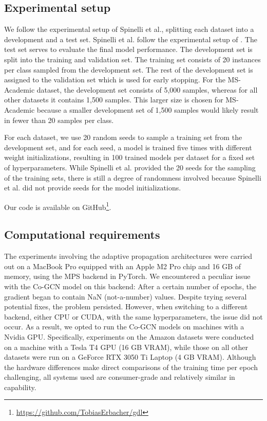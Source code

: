 \documentclass{gdl}
\begin{document}
\subsection{Experimental setup}
\label{sec:experimental-setup}
We follow the experimental setup of Spinelli et al., splitting each dataset into a development and a test set. Spinelli et al. follow the experimental setup of \cite{Klicpera2019}. The test set serves to evaluate the final model performance. The development set is split into the training and validation set. The training set consists of 20 instances per class sampled from the development set. The rest of the development set is assigned to the validation set which is used for early stopping. For the MS-Academic dataset, the development set consists of 5,000 samples, whereas for all other datasets it contains 1,500 samples. This larger size is chosen for MS-Academic because a smaller development set of 1,500 samples would likely result in fewer than 20 samples per class. 

For each dataset, we use 20 random seeds to sample a training set from the development set, and for each seed, a model is trained five times with different weight initializations, resulting in 100 trained models per dataset for a fixed set of hyperparameters. While Spinelli et al. provided the 20 seeds for the sampling of the training sets, there is still a degree of randomness involved because Spinelli et al. did not provide seeds for the model initializations.

Our code is available on GitHub\footnote{\url{https://github.com/TobiasErbacher/gdl}}.

\subsection{Computational requirements}
The experiments involving the adaptive propagation architectures were carried out on a MacBook Pro equipped with an Apple M2 Pro chip and 16 GB of memory, using the MPS backend in PyTorch. We encountered a peculiar issue with the Co-GCN model on this backend: After a certain number of epochs, the gradient began to contain NaN (not-a-number) values. Despite trying several potential fixes, the problem persisted. However, when switching to a different backend, either CPU or CUDA, with the same hyperparameters, the issue did not occur. As a result, we opted to run the Co-GCN models on machines with a Nvidia GPU. Specifically, experiments on the Amazon datasets were conducted on a machine with a Tesla T4 GPU (16 GB VRAM), while those on all other datasets were run on a GeForce RTX 3050 Ti Laptop (4 GB VRAM). Although the hardware differences make direct comparisons of the training time per epoch challenging, all systems used are consumer-grade and relatively similar in capability.
\end{document}
